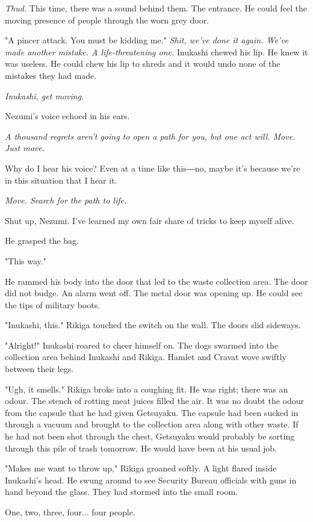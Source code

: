\emph{Thud.} This time, there was a sound behind them. The entrance. He could
feel the moving presence of people through the worn grey door.

"A pincer attack. You must be kidding me." \emph{Shit, we've done it again.
	We've made another mistake. A life-threatening one.} Inukashi chewed his
lip. He knew it was useless. He could chew his lip to shreds and it
would undo none of the mistakes they had made.

\emph{Inukashi, get moving.}

Nezumi's voice echoed in his ears.

\emph{A thousand regrets aren't going to open a path for you, but one act
	will. Move. Just move.}

Why do I hear his voice? Even at a time like this―no, maybe it's because
we're in this situation that I hear it.

\emph{Move. Search for the path to life.}

Shut up, Nezumi. I've learned my own fair share of tricks to keep myself
alive.

He grasped the bag.

"This way."

He rammed his body into the door that led to the waste collection area.
The door did not budge. An alarm went off. The metal door was opening
up. He could see the tips of military boots.

"Inukashi, this." Rikiga touched the switch on the wall. The doors slid
sideways.

"Alright!" Inukashi roared to cheer himself on. The dogs swarmed into
the collection area behind Inukashi and Rikiga. Hamlet and Cravat wove
swiftly between their legs.

"Ugh, it smells." Rikiga broke into a coughing fit. He was right; there
was an odour. The stench of rotting meat juices filled the air. It was
no doubt the odour from the capsule that he had given Getsuyaku. The
capsule had been sucked in through a vacuum and brought to the
collection area along with other waste. If he had not been shot through
the chest, Getsuyaku would probably be sorting through this pile of
trash tomorrow. He would have been at his usual job.

"Makes me want to throw up," Rikiga groaned softly. A light flared
inside Inukashi's head. He swung around to see Security Bureau officials
with guns in hand beyond the glass. They had stormed into the small
room.

One, two, three, four... four people.

